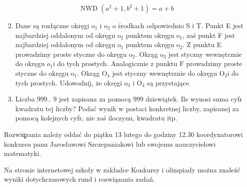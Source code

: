 \documentclass[10pt]{article}
\begin{document}
\[
\operatorname{NWD}\left(a^{2}+1, b^{2}+1\right)=a+b
\]

\begin{enumerate}
  \setcounter{enumi}{1}
  \item Dane są rozłączne okręgi \(\mathrm{o}_{1}\) i \(\mathrm{o}_{2}\) o środkach odpowiednio S i T. Punkt E jest najbardziej oddalonym od okręgu \(\mathrm{o}_{2}\) punktem okręgu \(\mathrm{o}_{1}\), zaś punkt F jest najbardziej oddalonym od okręgu \(\mathrm{o}_{1}\) punktem okręgu \(\mathrm{o}_{2}\). Z punktu E prowadzimy proste styczne do okręgu \(\mathrm{o}_{2}\). Okrąg \(\mathrm{o}_{3}\) jest styczny wewnętrznie do okręgu \(o_{1} \mathrm{i}\) do tych prostych. Analogicznie z punktu F prowadzimy proste styczne do okręgu \(\mathrm{o}_{1}\). Okrąg \(\mathrm{O}_{4}\) jest styczny wewnętrznie do okręgu \(\mathrm{O}_{2} \mathrm{i}\) do tych prostych. Udowodnij, że okręgi \(\mathrm{o}_{3}\) i \(\mathrm{O}_{4}\) są przystające.
  \item Liczba 999.. 9 jest zapisana za pomocą 999 dziewiątek. Ile wynosi suma cyfr kwadratu tej liczby? Podać wynik w postaci konkretnej liczby, zapisanej za pomocą kolejnych cyfr, nie zaś iloczynu, kwadratu itp.
\end{enumerate}

Rozwiq̨zania należy oddać do piątku 13 lutego do godziny 12.30 koordynatorowi konkursu panu Jarosławowi Szczepaniakowi lub swojemu nauczycielowi matematyki.

Na stronie internetowej szkoły w zakładce Konkursy i olimpiady można znaleźć wyniki dotychczasowych rund i rozwiązania zadań.
\end{document}
